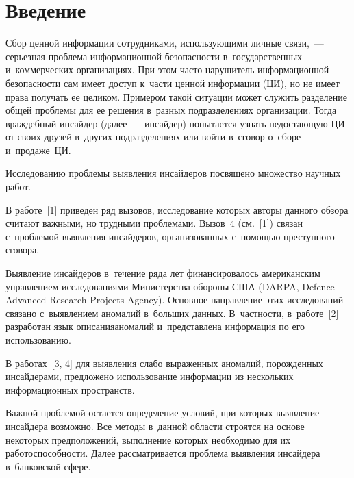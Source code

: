 
 
\vspace*{-5pt}



\thispagestyle{headings}

\begin{multicols}{2}

\label{st\stat}
  
\section{Введение }

  Сбор ценной информации сотрудниками, использующими личные связи,~--- 
серьезная проблема информационной безопасности в~государственных 
и~коммерческих организациях. При этом часто нарушитель информационной 
безопасности сам имеет доступ к~части ценной информации
(ЦИ), но не имеет права 
получать ее целиком. Примером такой ситуации может служить разделение общей 
проблемы для ее решения в~разных подразделениях организации. Тогда 
враждебный инсайдер (далее~--- инсайдер) попытается узнать недостающую 
ЦИ от своих друзей в~других подразделениях или войти в~сговор 
о~сборе и~продаже~ЦИ. 
  
  Исследованию проблемы выявления инсайдеров посвящено множество 
научных работ. 
  
  В работе~[1] приведен ряд вызовов, исследование которых авторы данного 
обзора считают важными, но трудными проблемами. Вызов~4 (см.~[1]) связан 
с~проб\-ле\-мой выявления инсайдеров, организованных с~помощью преступного 
сговора. 
  
  Выявление инсайдеров в~течение ряда лет финансировалось американским 
управлением исследованиями Министерства обороны США (DARPA, Defence Advanced Research
Projects Agency). Основное 
направление этих исследований связано с~выявлением аномалий в~больших 
данных. В~част\-ности, в~работе~[2] разработан язык описания\linebreak аномалий 
и~представлена информация по его использованию. 
  
  В работах~[3, 4] для выявления слабо выраженных аномалий, порожденных 
инсайдерами, предложено использование информации из нескольких 
информационных пространств. 
  
  Важной проблемой остается определение условий, при которых выявление 
инсайдера возможно. Все методы в~данной области строятся на основе некоторых 
предположений, выполнение которых необходимо для их работоспособности.  
Далее рассматривается проблема выявления инсайдера в~банковской сфере.
  

\end{multicols}
